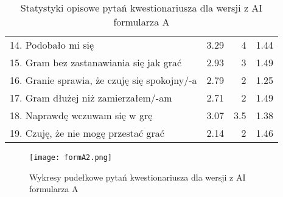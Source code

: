 \begin{table}[h!]
\begin{center}
\begin{tabular}{|m{10em}|r|r|r|}
            14. Podobało mi się                                               & 3.29          & 4       & 1.44           \\
            15. Gram bez zastanawiania się jak grać                           & 2.93          & 3       & 1.49           \\
            16. Granie sprawia, \newline że czuję się spokojny/-a             & 2.79          & 2       & 1.25           \\
            17. Gram dłużej \newline niż zamierzałem/-am                      & 2.71          & 2       & 1.49           \\
            18. Naprawdę wczuwam się w grę                                    & 3.07          & 3.5     & 1.38           \\
            19. Czuję, że nie mogę przestać grać                              & 2.14          & 2       & 1.46           \\
            \hline
        \end{tabular}
    \end{center}
    \caption{Statystyki opisowe pytań kwestionariusza dla wersji z AI formularza A}\label{tab1:appendixB_8}
\end{table}

\begin{figure}[h!]
    \centering
    \texttt{[image: formA2.png]}
    \caption{Wykresy pudełkowe pytań kwestionariusza dla wersji z AI formularza A}
    \label{fig:appendixB_formA2}
\end{figure}


